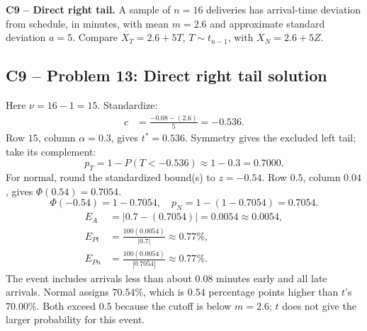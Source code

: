 {
\textbf{C9 -- Direct right tail.} A sample of $n=16$ deliveries has arrival-time deviation from schedule, in minutes, with mean $m=2.6$ and approximate standard deviation $a=5$. Compare $X_T=2.6+5T$, $T\sim t_{n-1}$, with $X_N=2.6+5Z$.
\label{sol:q13}
\subsection*{C9 -- Problem 13: Direct right tail solution }
Here $\nu=16-1=15$. Standardize:
\[
\begin{aligned}
c&=\frac{-0.08-(2.6)}{5}=-0.536.
\end{aligned}
\]
Row $15$, column $\alpha=0.3$, gives $t^*=0.536$. 
Symmetry gives the excluded left tail; take its complement:
\[
p_T=1-P(T<-0.536)\approx1-0.3=\boxed{0.7000}.
\]
For normal, round the standardized bound(s) to $z=-0.54$.
Row $0.5$, column $0.04$, gives $\Phi(0.54)=0.7054$. 
\[
\Phi(-0.54)=1-0.7054,\quad p_N=1-(1-0.7054)=\boxed{0.7054}.
\]
\[
\begin{aligned}
E_{A}&=|0.7-(0.7054)|=0.0054\approx\boxed{0.0054},\\
E_{Pt}&=\frac{100(0.0054)}{|0.7|}\approx\boxed{0.77\%},\\
E_{Pn}&=\frac{100(0.0054)}{|0.7054|}\approx\boxed{0.77\%}.
\end{aligned}
\]
The event includes arrivals less than about $0.08$ minutes early and all late arrivals. Normal assigns $70.54\%$, which is $0.54$ percentage points higher than $t$'s $70.00\%$. Both exceed $0.5$ because the cutoff is below $m=2.6$; $t$ does not give the larger probability for this event.
\secInicio[][sec:q13]
}

